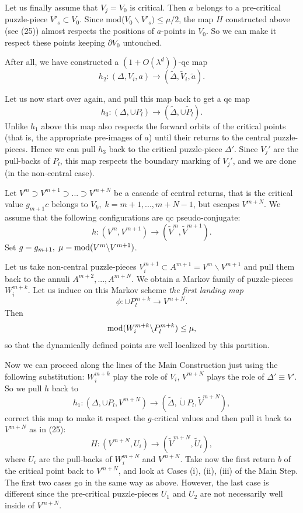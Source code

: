  Let us finally assume that $V_j=V_0$ is critical.
  Then $a$ belongs to a pre-critical puzzle-piece $V'_s\subset V_0$.
  Since mod($V_0\backslash V'_s)\leq \mu/2$, the map
   $H$ constructed above (see (25)) almost respects the positions of
  $a$-points in $V_0$.
  So we can make it respect these points keeping $\partial V_0$
   untouched.\smallskip 

  After all, we have constructed a $(1+O(\lambda^d))$-qc map 
$$h_2:(\Delta,V_i,a)\rightarrow (\tilde \Delta, \tilde V_i, \tilde a).$$ 

 
Let us now start over again, and  pull this map back to get a qc map
$$h_3 :  (\Delta, \cup P_l)\rightarrow (\tilde\Delta, \cup \tilde P_l).$$
 Unlike $h_1$ above this map also respects 
the forward orbits of the critical points 
(that is, the appropriate pre-images of $a$) until their
returns to the central puzzle-pieces. Hence
we can pull $h_3$ back to the critical puzzle-piece $\Delta'$.
Since $V_j'$ are
the pull-backs of $P_l$, this map respects the boundary marking of $V_j'$,
and we are done (in the non-central case).

 Let
$V^m\supset V^{m+1}\supset...\supset V^{m+N}$
be a cascade of central returns, that is the critical value
$g_{m+1} c$ belongs to $V_k,\; k=m+1,...,m+N-1$, but escapes $V^{m+N}$.
We assume that the following configurations are qc pseudo-conjugate:
$$ h: (V^m, V^{m+1})\rightarrow (\tilde V^m, \tilde V^{m+1}).$$ 
Set $g=g_{m+1}, \; \mu={\rm mod}(V^m\backslash V^{m+1})$.

Let us take non-central puzzle-pieces 
$V^{m+1}_i\subset A^{m+1}=V^m\backslash V^{m+1}$
 and pull them back to the annuli $A^{m+2},...,A^{m+N}.$ We obtain a
Markov family of puzzle-pieces $W^{m+k}_i$. Let us induce on this
Markov scheme  {\sl the first landing map} 
$$\phi: \cup P^{m+k}_l\rightarrow V^{m+N}. $$ 
Then $${\rm mod}(W^{m+k}_i\backslash P^{m+k}_l )\leq\mu, $$
so that the dynamically defined  points are well localized by this partition.

Now we can proceed along the lines of the Main Construction
just using  the following substitution: $W^{m+k}_i$ play the role of
$V_i$, $V^{m+N}$ plays the role of $\Delta'\equiv V'$.
So we pull $h$ back to 
$$h_1: (\Delta, \cup P_l, V^{m+N})\rightarrow
  (\tilde\Delta, \tilde\cup P_l, \tilde V^{m+N}), $$
correct this map to make it  respect the $g$-critical values and then
pull it back to $V^{m+N}$ as in (25):
$$H: (V^{m+N}, U_i)\rightarrow (\tilde V^{m+N}, \tilde U_i), $$
where $U_i$ are the pull-backs of $W^{m+N}_i$ and $V^{m+N}$.
Take now  the first return $b$ of the
critical point back to $V^{m+N}$,  and look at Cases (i), (ii), (iii)
of the Main Step.
The first two cases go in the same way as above. However, the last case is
different since the pre-critical puzzle-pieces $U_1$ and $U_2$
are not necessarily well inside of $V^{m+N}$. 

